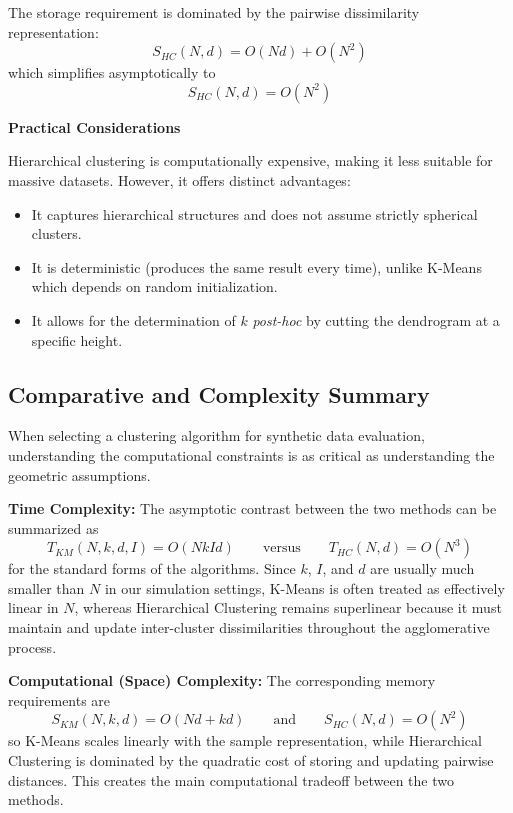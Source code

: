 The storage requirement is dominated by the pairwise dissimilarity representation:
\begin{equation}
  S_{HC}(N,d) = O(Nd) + O(N^2)
\end{equation}
which simplifies asymptotically to
\begin{equation}
  S_{HC}(N,d) = O(N^2)
\end{equation}

\textbf{Practical Considerations}

Hierarchical clustering is computationally expensive, making it less suitable for massive datasets. However, it offers distinct advantages:
\begin{itemize}
  \item It captures hierarchical structures and does not assume strictly spherical clusters.
  \item It is deterministic (produces the same result every time), unlike K-Means which depends on random initialization.
  \item It allows for the determination of $k$ \textit{post-hoc} by cutting the dendrogram at a specific height.
\end{itemize}

\subsection{Comparative and Complexity Summary}

When selecting a clustering algorithm for synthetic data evaluation, understanding the computational constraints is as critical as understanding the geometric assumptions.

\textbf{Time Complexity:} The asymptotic contrast between the two methods can be summarized as
\begin{equation}
  T_{KM}(N,k,d,I) = O(NkId)
  \qquad \text{versus} \qquad
  T_{HC}(N,d) = O(N^3)
\end{equation}
for the standard forms of the algorithms. Since $k$, $I$, and $d$ are usually much smaller than $N$ in our simulation settings, K-Means is often treated as effectively linear in $N$, whereas Hierarchical Clustering remains superlinear because it must maintain and update inter-cluster dissimilarities throughout the agglomerative process.

\textbf{Computational (Space) Complexity:} The corresponding memory requirements are
\begin{equation}
  S_{KM}(N,k,d) = O(Nd + kd)
  \qquad \text{and} \qquad
  S_{HC}(N,d) = O(N^2)
\end{equation}
so K-Means scales linearly with the sample representation, while Hierarchical Clustering is dominated by the quadratic cost of storing and updating pairwise distances. This creates the main computational tradeoff between the two methods.

